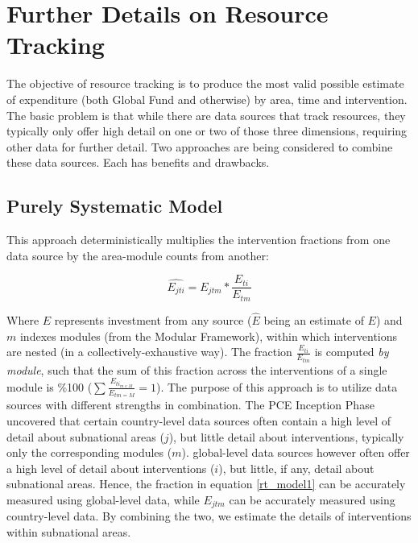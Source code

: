 \documentclass[twocolumn]{bmcart}%
\begin{document}
\section{Further Details on Resource Tracking} \label{resource_tracking}

The objective of resource tracking is to produce the most valid possible estimate of expenditure (both Global Fund and otherwise) by area, time and intervention. The basic problem is that while there are data sources that track resources, they typically only offer high detail on one or two of those three dimensions, requiring other data for further detail. Two approaches are being considered to combine these data sources. Each has benefits and drawbacks.

\subsection{Purely Systematic Model}

This approach deterministically multiplies the intervention fractions from one data source by the area-module counts from another:

\begin{equation} \label{rt_model1}
\widehat{E_{jti}}=E_{jtm}*\frac{E_{ti}}{E_{tm}}
\end{equation}

Where $E$ represents investment from any source ($\hat{E}$ being an estimate of $E$) and $m$ indexes modules (from the Modular Framework), within which interventions are nested (in a collectively-exhaustive way). The fraction $\frac{E_{ti}}{E_{tm}}$ is computed \textit{by module}, such that the sum of this fraction across the interventions of a single module is \%100 ($\sum \frac{E_{ti_{m\in M}}}{E_{tm=M}}=1$). The purpose of this approach is to utilize data sources with different strengths in combination. The PCE Inception Phase uncovered that certain country-level data sources often contain a high level of detail about subnational areas ($j$), but little detail about interventions, typically only the corresponding modules ($m$). global-level data sources however often offer a high level of detail about interventions ($i$), but little, if any, detail about subnational areas. Hence, the fraction in equation \ref{rt_model1} can be accurately measured using global-level data, while $E_{jtm}$ can be accurately measured using country-level data. By combining the two, we estimate the details of interventions within subnational areas.\\
\end{document}
